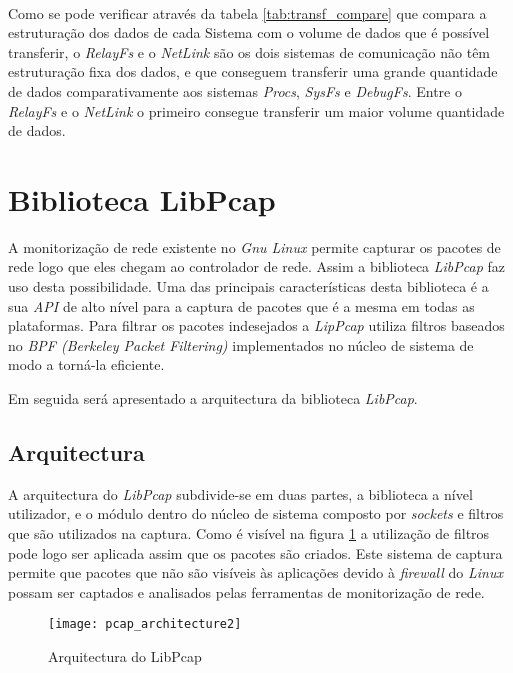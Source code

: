 \paragraph*{}
Como se pode verificar através da tabela \ref{tab:transf_compare} que compara a estruturação dos dados de cada Sistema com o volume de dados que é possível transferir, o \textit{RelayFs} e o \textit{NetLink} são os dois sistemas de comunicação não têm estruturação fixa dos dados, e que conseguem transferir uma grande quantidade de dados comparativamente aos sistemas \textit{Procs}, \textit{SysFs} e \textit{DebugFs}. Entre o \textit{RelayFs} e o \textit{NetLink} o primeiro consegue transferir um maior volume quantidade de dados.

\section{Biblioteca LibPcap}\label{sect:LibPcap}

A monitorização de rede existente no \textit{Gnu Linux} permite capturar os pacotes de rede logo que eles chegam ao controlador de rede. Assim a biblioteca \textit{LibPcap}\cite{:LibPcap} faz uso desta possibilidade. Uma das principais características desta biblioteca é a sua \textit{API} de alto nível para a captura de pacotes que é a mesma em todas as plataformas. Para filtrar os pacotes indesejados a \textit{LipPcap} utiliza filtros baseados no \textit{BPF (Berkeley Packet Filtering)} implementados no núcleo de sistema de modo a torná-la eficiente.

Em seguida será apresentado a arquitectura da biblioteca \textit{LibPcap}.

\subsection {Arquitectura}\label{sect:architecture_libpcap}
A arquitectura do \textit{LibPcap} subdivide-se em duas partes, a biblioteca a nível utilizador, e o módulo dentro do núcleo de sistema composto por \textit{sockets} e filtros que são utilizados na captura. Como é visível na figura \ref{fig:pcap_architecture} a utilização de filtros pode logo ser aplicada assim que os pacotes são criados. Este sistema de captura permite que pacotes que não são visíveis às aplicações devido à \textit{firewall} do \textit{Linux} possam ser captados e analisados pelas ferramentas de monitorização de rede.

\begin{figure}[h]
       \centering
       \texttt{[image: pcap\_architecture2]}
       \caption{Arquitectura do LibPcap}
      \label{fig:pcap_architecture}
\end{figure}

